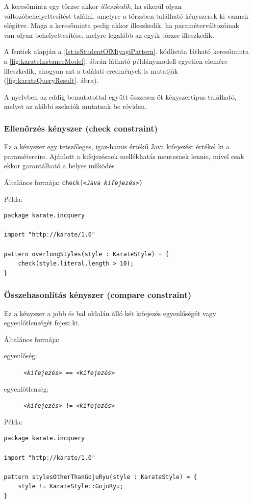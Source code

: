 A keresőminta egy törzse akkor \emph{illeszkedik}, ha sikerül olyan változóbehelyettesítést találni, amelyre a törzsben található kényszerek ki vannak elégítve.
Maga a keresőminta pedig akkor illeszkedik, ha paraméterváltozóinak van olyan behelyettesítése, melyre legalább az egyik törzse illeszkedik.

A fentiek alapján a \ref{lst:isStudentOfMiyagiPattern}. kódlistán látható keresőminta a \ref{fig:karateInstanceModel}. ábrán látható példánymodell egyetlen elemére illeszkedik, ahogyan azt a találati eredmények is mutatják (\ref{fig:karateQueryResult}. ábra).

A nyelvben az eddig bemutatottal együtt összesen öt kényszertípus található, melyet az alábbi szekciók mutatnak be röviden.

\subsubsection{Ellenőrzés kényszer (check constraint)}
Ez a kényszer egy tetszőleges, igaz-hamis értékű Java kifejezést értékel ki a paramétereire.
Ajánlott a kifejezésnek mellékhatás mentesnek lennie, mivel csak ekkor garantálható a helyes működés \cite{EclipseOrgIncQueryLang}.

\noindent Általános formája: \texttt{check(\textit{<Java kifejezés>})}

\noindent Példa:
\begin{lstlisting}
package karate.incquery

import "http://karate/1.0"

pattern overlongStyles(style : KarateStyle) = {
    check(style.literal.length > 10);
}
\end{lstlisting}
    
\subsubsection{Összehasonlítás kényszer (compare constraint)}
Ez a kényszer a jobb és bal oldalán álló két kifejezés egyenlőségét vagy egyenlőtlenségét fejezi ki.

\noindent Általános formája:
\begin{description}
\item[egyenlőség:] \texttt{\textit{<kifejezés>} == \textit{<kifejezés>}}
\item[egyenlőtlenség:] \texttt{\textit{<kifejezés>} != \textit{<kifejezés>}}
\end{description}

\noindent Példa:
\begin{lstlisting}
package karate.incquery

import "http://karate/1.0"

pattern stylesOtherThanGojuRyu(style : KarateStyle) = {
    style != KarateStyle::GojuRyu; 
}
\end{lstlisting}
    
